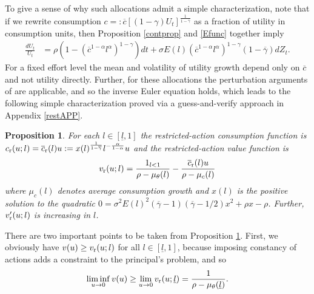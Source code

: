 \documentclass[11pt]{article}
\theoremstyle{plain}
\newtheorem{prop}[thm]{Proposition}
\begin{document}
To give a sense of why such allocations admit a simple characterization, note that if we rewrite consumption $c =: \overline{c}[(1-\gamma)U_t]^{\frac{1}{1-\overline{\gamma}}}$ as a fraction of utility in consumption units, then Proposition \ref{contprop} and \eqref{Efunc} together imply
\begin{align*}
\frac{dU_t}{U_t} & = \rho{\left(1-(\overline{c}^{1-\alpha}l^{\alpha})^{1-\gamma}\right)}dt + \sigma E(l)(\overline{c}^{1-\alpha}l^{\alpha})^{1-\gamma}(1-\overline{\gamma})dZ_t.
\end{align*} 
For a fixed effort level the mean and volatility of utility growth depend only on $\overline{c}$ and not utility directly. Further, for these allocations the perturbation arguments of \cite{golosov_optimal_2003} are applicable, and so the inverse Euler equation holds, which leads to the following simple characterization proved via a guess-and-verify approach in Appendix \ref{restAPP}.
\begin{prop}\label{propREST}
For each $l \in [\underline{l},1]$ the restricted-action consumption function is $c_{\textnormal{r}}(u;l) = \overline{c}_{\textnormal{r}}(l) u := x(l)^{\frac{1}{1-\overline{\gamma}}}l^{-\frac{\alpha }{1-\alpha}}u$ and the restricted-action value function is
$$
v_{\textnormal{r}}(u;l) = \frac{1_{l<1}}{\rho - \mu_{\theta}(l)} - \frac{\overline{c}_{\textnormal{r}}(l) u}{\rho - \mu_c(l)}
$$
where $\mu_c(l)$ denotes average consumption growth and $x(l)$ is the positive solution to the quadratic $0 = \sigma^2E(l)^2(\overline{\gamma}-1)(\overline{\gamma}-1/2)x^2 + \rho x - \rho$. Further, $v_{\textnormal{r}}'(u;l)$ is increasing in $l$. 
\end{prop} 
There are two important points to be taken from Proposition \ref{propREST}. First, we obviously have $v(u) \geq v_{\textnormal{r}}(u;l)$ for all $l \in [\underline{l},1]$, because imposing constancy of actions adds a constraint to the principal's problem, and so 
\begin{equation}
\liminf_{u \rightarrow 0} v(u) \geq \lim_{u \rightarrow 0} v_{\textnormal{r}}(u;\underline{l}) = \frac{1}{\rho - \mu_{\theta}(\underline{l})}.
\label{high_eff_zero}
\end{equation}
\end{document}
